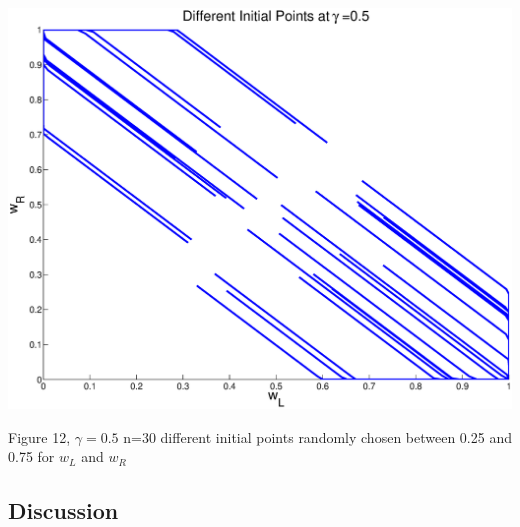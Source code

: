 \documentclass{article}
\begin{document}
\begin{center}
\includegraphics[width=\textwidth]{norm_init2.eps}
\begin{footnotesize}
 Figure 12, $\gamma=0.5$ n=30 different initial points randomly chosen between 0.25 and 0.75 for $w_L$ and $w_R$
\end{footnotesize}
\end{center}

\subsection{Discussion}
\end{document}
